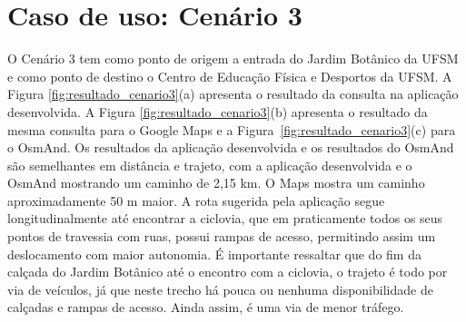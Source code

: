 \documentclass[oneside,openright,12pt]{ufsm_2015} %
\begin{document}
\section{Caso de uso: Cenário 3}
O Cenário 3 tem como ponto de origem a entrada do Jardim Botânico da UFSM e como ponto de destino o Centro de Educação Física e Desportos da UFSM.
A Figura \ref{fig:resultado_cenario3}(a) apresenta o resultado da consulta na aplicação desenvolvida.
A Figura \ref{fig:resultado_cenario3}(b) apresenta o resultado da mesma consulta para o Google Maps e a Figura~\ref{fig:resultado_cenario3}(c) para o OsmAnd.
Os resultados da aplicação desenvolvida e os resultados do OsmAnd são semelhantes em distância e trajeto, com a aplicação desenvolvida e o OsmAnd mostrando um caminho de 2,15 km. 
O Maps mostra um caminho aproximadamente 50 m maior. 
A rota sugerida pela aplicação segue longitudinalmente até encontrar a ciclovia, que em praticamente todos os seus pontos de travessia com ruas, possui rampas de acesso, permitindo assim um deslocamento com maior autonomia. 
É importante ressaltar que do fim da calçada do Jardim Botânico até o encontro com a ciclovia, o trajeto é todo por via de veículos, já que neste trecho há pouca ou nenhuma disponibilidade de calçadas e rampas de acesso. 
Ainda assim, é uma via de menor tráfego.
\end{document}
